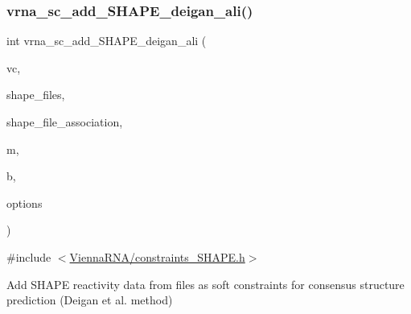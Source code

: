 \subsubsection{\texorpdfstring{vrna\+\_\+sc\+\_\+add\+\_\+\+S\+H\+A\+P\+E\+\_\+deigan\+\_\+ali()}{vrna\_sc\_add\_SHAPE\_deigan\_ali()}}
{\footnotesize\ttfamily int vrna\+\_\+sc\+\_\+add\+\_\+\+S\+H\+A\+P\+E\+\_\+deigan\+\_\+ali (\begin{DoxyParamCaption}\item[{\mbox{\hyperlink{group__fold__compound_ga1b0cef17fd40466cef5968eaeeff6166}{vrna\+\_\+fold\+\_\+compound\+\_\+t}} $\ast$}]{vc,  }\item[{const char $\ast$$\ast$}]{shape\+\_\+files,  }\item[{const int $\ast$}]{shape\+\_\+file\+\_\+association,  }\item[{double}]{m,  }\item[{double}]{b,  }\item[{unsigned int}]{options }\end{DoxyParamCaption})}



{\ttfamily \#include $<$\mbox{\hyperlink{constraints___s_h_a_p_e_8h}{Vienna\+R\+N\+A/constraints\+\_\+\+S\+H\+A\+P\+E.\+h}}$>$}



Add S\+H\+A\+PE reactivity data from files as soft constraints for consensus structure prediction (Deigan et al. method) 


